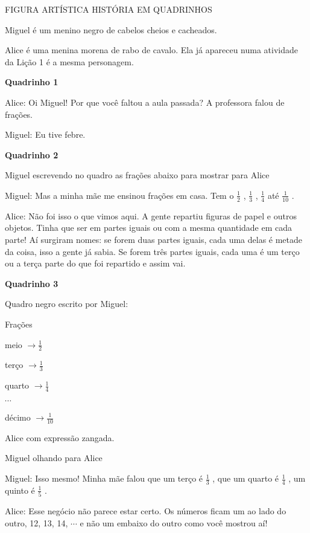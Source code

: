 \documentclass[a4,12pt]{book}
\begin{document}
\begin{imagem*}[breakable]{}{}   FIGURA ARTÍSTICA  
  HISTÓRIA EM QUADRINHOS  
  
  Miguel é um menino negro de cabelos cheios e cacheados.  
  
  Alice é uma menina morena de rabo de cavalo. Ela já apareceu numa atividade da Lição 1 é a mesma personagem.  
  
  {\bf Quadrinho 1}  
  
  Alice: Oi Miguel! Por que você faltou a aula passada? A professora falou de frações.  
  
  Miguel: Eu tive febre.   
  
  {\bf Quadrinho 2}  
  
  Miguel escrevendo no quadro as frações abaixo para mostrar para Alice  
  
  Miguel: Mas a minha mãe me ensinou frações em casa. Tem o   $\frac{1}{2}$  ,   $\frac{1}{3}$  ,   $\frac{1}{4}$   até   $\frac{1}{10}$  .  
  
  Alice: Não foi isso o que vimos aqui. A gente repartiu figuras de papel e outros objetos. Tinha que ser em partes iguais ou com a mesma quantidade em cada parte! Aí surgiram nomes: se forem duas partes iguais, cada uma delas é metade da coisa, isso a gente já sabia. Se forem três partes iguais, cada uma é um terço ou a terça parte do que foi repartido e assim vai.  
  
  {\bf Quadrinho 3}  
  
  Quadro negro escrito por Miguel:  
  
  Frações  
  
  meio   $\longrightarrow \frac{1}{2}$     
  
  terço   $\longrightarrow \frac{1}{3}$  
  
  quarto   $\longrightarrow \frac{1}{4}$  
  
  $\cdots$  
  
  décimo   $\longrightarrow \frac{1}{10}$  
  
  Alice com expressão zangada.  
  
  Miguel olhando para Alice  
  
  Miguel: Isso mesmo! Minha mãe falou que um terço é   $\frac{1}{3}$  , que um quarto é   $\frac{1}{4}$  , um quinto é   $\frac{1}{5}$  .  
  
  Alice: Esse negócio não parece estar certo. Os números ficam um ao lado do outro, 12, 13, 14,   $\cdots$   e não um embaixo do outro como você mostrou aí!  
  

\end{imagem*}
\end{document}
